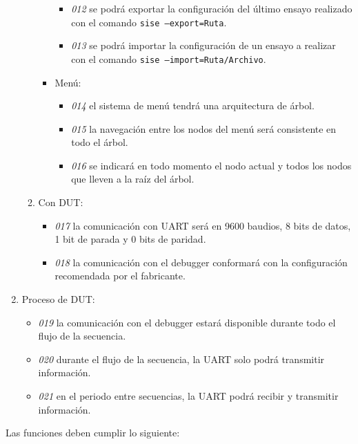 \begin{enumerate}
\begin{enumerate}
\begin{itemize}
\begin{itemize}
							\item \emph{012} se podrá exportar la configuración del último ensayo realizado con el comando \texttt{sise --export=Ruta}.
							\item \emph{013} se podrá importar la configuración de un ensayo a realizar con el comando \texttt{sise --import=Ruta/Archivo}.
						\end{itemize}
					\item Menú:
						\begin{itemize}
							\item \emph{014} el sistema de menú tendrá una arquitectura de árbol.
							\item \emph{015} la navegación entre los nodos del menú será consistente en todo el árbol.
							\item \emph{016} se indicará en todo momento el nodo actual y todos los nodos que lleven a la raíz del árbol.
						\end{itemize}
				\end{itemize}
			\item Con DUT:
				\begin{itemize}
					\item \emph{017} la comunicación con UART será en 9600 baudios, 8 bits de datos, 1 bit de parada y 0 bits de paridad.
					\item \emph{018} la comunicación con el debugger conformará con la configuración recomendada por el fabricante.
				\end{itemize}
		\end{enumerate}
	\item Proceso de DUT:
		\begin{itemize}
			\item \emph{019} la comunicación con el debugger estará disponible durante todo el flujo de la secuencia.
			\item \emph{020} durante el flujo de la secuencia, la UART solo podrá transmitir información.
			\item \emph{021} en el periodo entre secuencias, la UART podrá recibir y transmitir información.
		\end{itemize}
\end{enumerate}

Las funciones deben cumplir lo siguiente:

